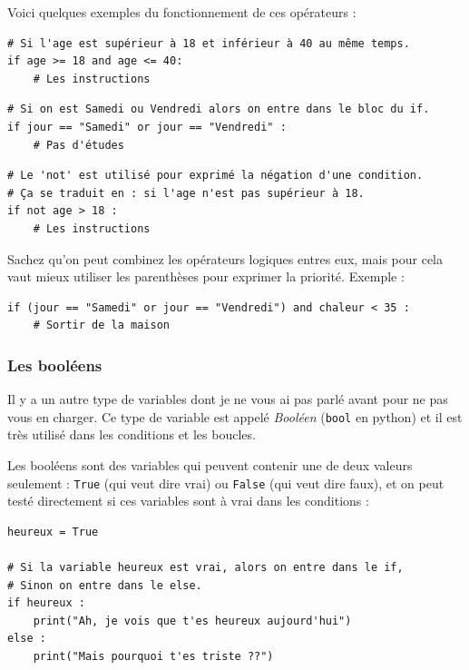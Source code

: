 \documentclass[12pt]{article}
\newcommand{\code}[1]{\colorbox{light-gray}{\texttt{#1}}}
\begin{document}
            Voici quelques exemples du fonctionnement de ces opérateurs :
            \begin{lstlisting}[style=code]
# Si l'age est supérieur à 18 et inférieur à 40 au même temps.
if age >= 18 and age <= 40:
    # Les instructions
            \end{lstlisting}

            \begin{lstlisting}[style=code, breaklines=false]
# Si on est Samedi ou Vendredi alors on entre dans le bloc du if.
if jour == "Samedi" or jour == "Vendredi" :
    # Pas d'études
            \end{lstlisting}

            \begin{lstlisting}[style=code]
# Le 'not' est utilisé pour exprimé la négation d'une condition.
# Ça se traduit en : si l'age n'est pas supérieur à 18.
if not age > 18 :
    # Les instructions 
            \end{lstlisting}

            Sachez qu'on peut combinez les opérateurs logiques entres eux, mais pour cela vaut mieux 
            utiliser les parenthèses pour exprimer la priorité. Exemple :
            \begin{lstlisting}[style=code]
if (jour == "Samedi" or jour == "Vendredi") and chaleur < 35 :
    # Sortir de la maison
            \end{lstlisting}

        \subsubsection{Les booléens}
            Il y a un autre type de variables dont je ne vous ai pas parlé avant pour ne pas vous en charger. 
            Ce type de variable est appelé \emph{Booléen} (\code{bool} en python) et il est très 
            utilisé dans les conditions et les boucles. 

            Les booléens sont des variables qui peuvent contenir une de deux valeurs seulement : \code{True} 
            (qui veut dire vrai) ou \code{False} (qui veut dire faux), et on peut testé directement si ces 
            variables sont à vrai dans les conditions : 
            \begin{lstlisting}[style=code]
heureux = True

# Si la variable heureux est vrai, alors on entre dans le if,
# Sinon on entre dans le else.
if heureux :
    print("Ah, je vois que t'es heureux aujourd'hui")
else :
    print("Mais pourquoi t'es triste ??")
            \end{lstlisting}
        
\end{document}
